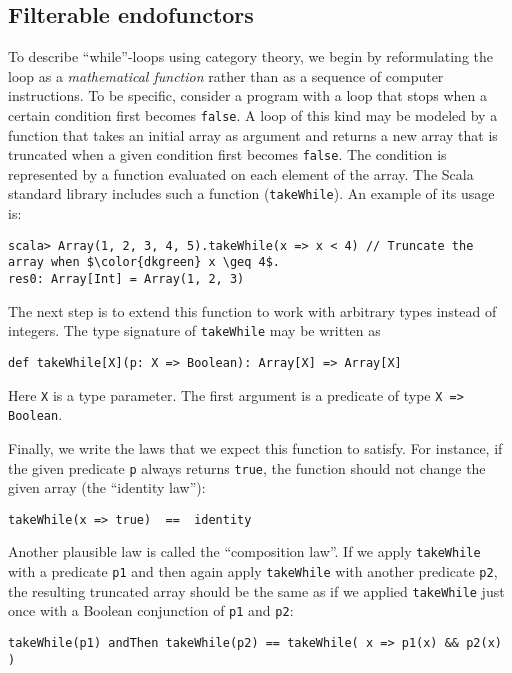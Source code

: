 \subsection{Filterable endofunctors}

To describe \textsf{``}while\textsf{''}-loops using category theory, we begin by reformulating
the loop as a \emph{mathematical function} rather than as a sequence
of computer instructions. To be specific, consider a program with
a loop that stops when a certain condition first becomes \lstinline!false!.
A loop of this kind may be modeled by a function that takes an initial
array as argument and returns a new array that is truncated when a
given condition first becomes \lstinline!false!. The condition is
represented by a function evaluated on each element of the array.
The Scala standard library includes such a function (\lstinline!takeWhile!).
An example of its usage is:
\begin{lstlisting}[mathescape=true]
scala> Array(1, 2, 3, 4, 5).takeWhile(x => x < 4) // Truncate the array when $\color{dkgreen} x \geq 4$.
res0: Array[Int] = Array(1, 2, 3) 
\end{lstlisting}
The next step is to extend this function to work with arbitrary types
instead of integers. The type signature of \lstinline!takeWhile!
may be written as
\begin{lstlisting}
def takeWhile[X](p: X => Boolean): Array[X] => Array[X]
\end{lstlisting}
Here \lstinline!X! is a type parameter. The first argument is a predicate
of type \lstinline!X => Boolean!.

Finally, we write the laws that we expect this function to satisfy.
For instance, if the given predicate \lstinline!p! always returns
\lstinline!true!, the function should not change the given array
(the \textsf{``}identity law\textsf{''}):
\begin{lstlisting}
takeWhile(x => true)  ==  identity
\end{lstlisting}
Another plausible law is called the \textsf{``}composition law\textsf{''}. If we apply
\lstinline!takeWhile! with a predicate \lstinline!p1! and then again
apply \lstinline!takeWhile! with another predicate \lstinline!p2!,
the resulting truncated array should be the same as if we applied
\lstinline!takeWhile! just once with a Boolean conjunction of \lstinline!p1!
and \lstinline!p2!: 
\begin{lstlisting}
takeWhile(p1) andThen takeWhile(p2) == takeWhile( x => p1(x) && p2(x) )
\end{lstlisting}

